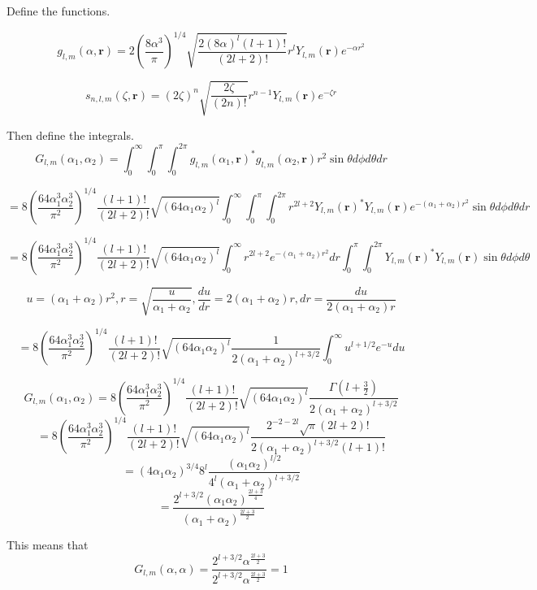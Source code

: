 \documentclass[12pt]{article}
\begin{document}
Define the functions.

$$g_{l,m}(\alpha, \mathbf{r}) = 2\left(\frac{8\alpha^3}{\pi}\right)^{1/4} \sqrt{\frac{2(8\alpha)^l(l + 1)!}{(2l + 2)!}} r^l Y_{l,m}(\mathbf{r}) e^{-\alpha r^2}$$

$$s_{n,l,m}(\zeta, \mathbf{r}) = (2\zeta)^n \sqrt{\frac{2\zeta}{(2n)!}} r^{n-1}Y_{l,m}(\mathbf{r}) e^{-\zeta r}$$

Then define the integrals.
$$G_{l,m}(\alpha_1, \alpha_2) = \int_0^\infty \int_0^\pi\int_0^{2\pi} g_{l,m}(\alpha_1, \mathbf{r})^* g_{l,m}(\alpha_2, \mathbf{r}) r^2 \sin\theta d\phi d\theta dr$$

$$= 8\left(\frac{64\alpha_1^3\alpha_2^3}{\pi^2}\right)^{1/4}\frac{(l + 1)!}{(2l + 2)!}\sqrt{\left(64\alpha_1\alpha_2\right)^l}\int_0^\infty \int_0^\pi \int_0^{2\pi} r^{2l + 2} Y_{l,m}(\mathbf{r})^*Y_{l,m}(\mathbf{r}) e^{-(\alpha_1 + \alpha_2) r^2} \sin\theta d\phi d\theta dr$$

$$= 8\left(\frac{64\alpha_1^3\alpha_2^3}{\pi^2}\right)^{1/4}\frac{(l + 1)!}{(2l + 2)!}\sqrt{\left(64\alpha_1\alpha_2\right)^l}\int_0^\infty r^{2l + 2} e^{-(\alpha_1 + \alpha_2)r^2} dr \int_0^\pi \int_0^{2\pi} Y_{l,m}(\mathbf{r})^*Y_{l,m}(\mathbf{r}) \sin\theta d\phi d\theta$$

$$u = (\alpha_1 + \alpha_2)r^2, r = \sqrt{\frac{u}{\alpha_1 + \alpha_2}}, \frac{du}{dr} = 2(\alpha_1 + \alpha_2)r, dr = \frac{du}{2(\alpha_1 + \alpha_2)r}$$

$$ = 8\left(\frac{64\alpha_1^3\alpha_2^3}{\pi^2}\right)^{1/4}\frac{(l + 1)!}{(2l + 2)!}\sqrt{\left(64\alpha_1\alpha_2\right)^l} \frac{1}{2\left(\alpha_1 + \alpha_2\right)^{l + 3/2}} \int_0^\infty u^{l + 1/2} e^{-u} du$$

$$G_{l,m}(\alpha_1, \alpha_2) = 8\left(\frac{64\alpha_1^3\alpha_2^3}{\pi^2}\right)^{1/4}\frac{(l + 1)!}{(2l + 2)!}\sqrt{\left(64\alpha_1\alpha_2\right)^l} \frac{\Gamma\left(l  + \frac{3}{2}\right)}{2\left(\alpha_1 + \alpha_2\right)^{l + 3/2}}$$
$$ = 8\left(\frac{64\alpha_1^3\alpha_2^3}{\pi^2}\right)^{1/4}\frac{(l + 1)!}{(2l + 2)!}\sqrt{\left(64\alpha_1\alpha_2\right)^l} \frac{2^{-2-2l}\sqrt{\pi}(2l + 2)!}{2\left(\alpha_1+\alpha_2\right)^{l + 3/2}(l + 1)!}$$
$$ = \left(4\alpha_1\alpha_2\right)^{3/4}8^l \frac{\left(\alpha_1\alpha_2\right)^{l/2}}{4^l \left(\alpha_1 + \alpha_2\right)^{l + 3/2}}$$
$$= \frac{2^{l +3/2} \left(\alpha_1\alpha_2\right)^{\frac{2l + 3}{4}}}{\left(\alpha_1 + \alpha_2\right)^{\frac{2l + 3}{2}}}$$

This means that
$$G_{l,m}(\alpha,\alpha) = \frac{2^{l + 3/2} \alpha^{\frac{2l + 3}{2}}}{2^{l + 3/2} \alpha^{\frac{2l + 3}{2}}} = 1$$
\end{document}
